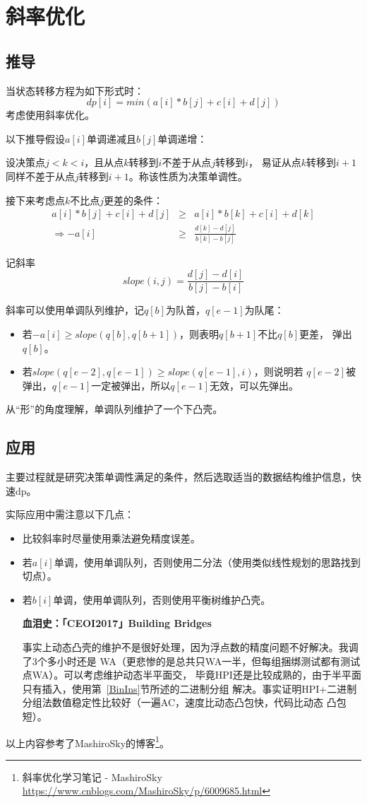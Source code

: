 \section{斜率优化}\label{Slope}
\subsection{推导}
当状态转移方程为如下形式时：
\begin{displaymath}
    dp[i]=min(a[i]*b[j]+c[i]+d[j])
\end{displaymath}
考虑使用斜率优化。

以下推导假设$a[i]$单调递减且$b[j]$单调递增：

设决策点$j<k<i$，且从点$k$转移到$i$不差于从点$j$转移到$i$，
易证从点$k$转移到$i+1$同样不差于从点$j$转移到$i+1$。称该性质为决策单调性。

接下来考虑点$k$不比点$j$更差的条件：
\begin{eqnarray*}
    a[i]*b[j]+c[i]+d[j]&\geq&a[i]*b[k]+c[i]+d[k]\\
    \Rightarrow -a[i]&\geq&\frac{d[k]-d[j]}{b[k]-b[j]}
\end{eqnarray*}

记斜率
\begin{displaymath}
    slope(i,j)=\frac{d[j]-d[i]}{b[j]-b[i]}
\end{displaymath}

斜率可以使用单调队列维护，记$q[b]$为队首，$q[e-1]$为队尾：
\begin{itemize}
    \item 若$-a[i]\geq slope(q[b],q[b+1])$，则表明$q[b+1]$不比$q[b]$更差，
    弹出$q[b]$。
    \item 若$slope(q[e-2],q[e-1])\geq slope(q[e-1],i)$，则说明若
    $q[e-2]$被弹出，$q[e-1]$一定被弹出，所以$q[e-1]$无效，可以先弹出。
\end{itemize}

从``形''的角度理解，单调队列维护了一个下凸壳。
\subsection{应用}
主要过程就是研究决策单调性满足的条件，然后选取适当的数据结构维护信息，快速dp。

实际应用中需注意以下几点：
\begin{itemize}
    \item 比较斜率时尽量使用乘法避免精度误差。
    \item 若$a[i]$单调，使用单调队列，否则使用二分法（使用类似线性规划的思路找到切点）。
    \item 若$b[i]$单调，使用单调队列，否则使用平衡树维护凸壳。

    {\bfseries 血泪史：「CEOI2017」Building Bridges

    事实上动态凸壳的维护不是很好处理，因为浮点数的精度问题不好解决。我调了3个多小时还是
    WA（更悲惨的是总共只WA一半，但每组捆绑测试都有测试点WA）。可以考虑维护动态半平面交，
    毕竟HPI还是比较成熟的，由于半平面只有插入，使用第~\ref{BinIns}节所述的二进制分组
    解决。事实证明HPI+二进制分组法数值稳定性比较好（一遍AC，速度比动态凸包快，代码比动态
    凸包短）。
    }
\end{itemize}

以上内容参考了MashiroSky的博客\footnote{斜率优化学习笔记 - MashiroSky
    \url{https://www.cnblogs.com/MashiroSky/p/6009685.html}
}。
